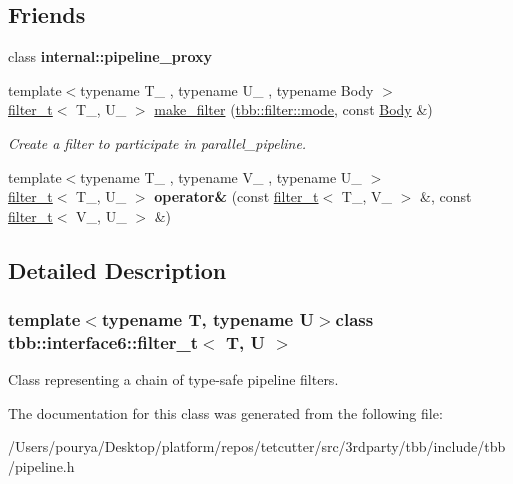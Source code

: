 \subsection*{Friends}
\begin{DoxyCompactItemize}
\item 
\hypertarget{classtbb_1_1interface6_1_1filter__t_a49b422a3c97d5dc848d177246de4c149}{}class {\bfseries internal\+::pipeline\+\_\+proxy}\label{classtbb_1_1interface6_1_1filter__t_a49b422a3c97d5dc848d177246de4c149}

\item 
\hypertarget{classtbb_1_1interface6_1_1filter__t_a21460fde704da22caa222778f5abb140}{}{\footnotesize template$<$typename T\+\_\+ , typename U\+\_\+ , typename Body $>$ }\\\hyperlink{classtbb_1_1interface6_1_1filter__t}{filter\+\_\+t}$<$ T\+\_\+, U\+\_\+ $>$ \hyperlink{classtbb_1_1interface6_1_1filter__t_a21460fde704da22caa222778f5abb140}{make\+\_\+filter} (\hyperlink{classtbb_1_1filter_a8145c736bafcf0b401d50bf1a1df9125}{tbb\+::filter\+::mode}, const \hyperlink{classBody}{Body} \&)\label{classtbb_1_1interface6_1_1filter__t_a21460fde704da22caa222778f5abb140}

\begin{DoxyCompactList}\small\item\em Create a filter to participate in parallel\+\_\+pipeline. \end{DoxyCompactList}\item 
\hypertarget{classtbb_1_1interface6_1_1filter__t_aa80730e1b71fa4266ca0d1dc12da6caa}{}{\footnotesize template$<$typename T\+\_\+ , typename V\+\_\+ , typename U\+\_\+ $>$ }\\\hyperlink{classtbb_1_1interface6_1_1filter__t}{filter\+\_\+t}$<$ T\+\_\+, U\+\_\+ $>$ {\bfseries operator\&} (const \hyperlink{classtbb_1_1interface6_1_1filter__t}{filter\+\_\+t}$<$ T\+\_\+, V\+\_\+ $>$ \&, const \hyperlink{classtbb_1_1interface6_1_1filter__t}{filter\+\_\+t}$<$ V\+\_\+, U\+\_\+ $>$ \&)\label{classtbb_1_1interface6_1_1filter__t_aa80730e1b71fa4266ca0d1dc12da6caa}

\end{DoxyCompactItemize}


\subsection{Detailed Description}
\subsubsection*{template$<$typename T, typename U$>$class tbb\+::interface6\+::filter\+\_\+t$<$ T, U $>$}

Class representing a chain of type-\/safe pipeline filters. 

The documentation for this class was generated from the following file\+:\begin{DoxyCompactItemize}
\item 
/\+Users/pourya/\+Desktop/platform/repos/tetcutter/src/3rdparty/tbb/include/tbb/pipeline.\+h\end{DoxyCompactItemize}
